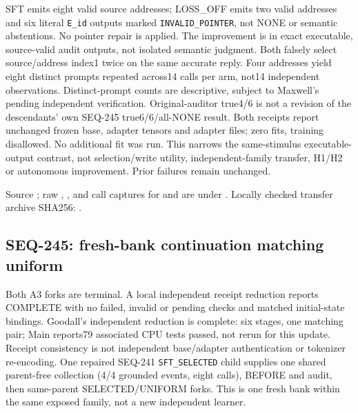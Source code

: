 \documentclass{article}
\begin{document}
SFT emits eight valid source addresses; LOSS\_OFF emits two valid addresses
and six literal \texttt{E\_id} outputs marked \texttt{INVALID\_POINTER}, not
NONE or semantic abstentions. No pointer repair is applied. The improvement
is in exact executable, source-valid audit outputs, not isolated semantic judgment.
Both falsely select source/address index1 twice on the same accurate reply.
Four addresses yield eight distinct prompts repeated across14 calls per arm,
not14 independent observations. Distinct-prompt counts are descriptive,
subject to Maxwell's pending independent verification. Original-auditor true4/6
is not a revision of the descendants' own SEQ-245 true6/6/all-NONE result.
Both receipts report unchanged frozen base, adapter tensors and adapter files;
zero fits, training disallowed. No additional fit was run. This narrows the
same-stimulus executable-output contrast, not selection/write utility, independent-family
transfer, H1/H2 or autonomous improvement. Prior failures remain unchanged.

Source ; raw , ,
 and call captures for  and
 are under
.
Locally checked transfer archive SHA256:
.

\subsection{SEQ-245: fresh-bank continuation matching uniform}
\label{sec:fresh-reader-cycle}

Both A3 forks are terminal. A local independent receipt reduction reports
COMPLETE with no failed, invalid or pending checks and matched initial-state
bindings. Goodall's independent reduction is complete: six stages, one matching
pair; Main reports79 associated CPU tests passed, not rerun for this update.
Receipt consistency is not independent base/adapter authentication or tokenizer
re-encoding. One repaired SEQ-241 \texttt{SFT\_SELECTED} child supplies one
shared parent-free collection (4/4 grounded events, eight calls), BEFORE and
audit, then same-parent SELECTED/UNIFORM forks. This is one fresh bank within
the same exposed family, not a new independent learner.
\end{document}
